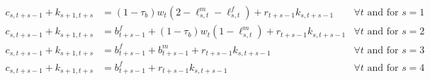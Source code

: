    \begin{subequations}
 \label{eq:BCs}
 	 \begin{align}
 	c_{s,t+s-1} + k_{s+1,t+s} &= (1-\tau_b)w_t (2-\ell_{s,t}^m - \ell_{s,t}^f) + r_{t+s-1}k_{s,t+s-1} & \forall t\text{ and for $s=1$} \\
 	c_{s,t+s-1} + k_{s+1,t+s} &= b_{t+s-1}^f+(1-\tau_b)w_t (1-\ell_{s,t}^m ) + r_{t+s-1}k_{s,t+s-1} & \forall t\text{ and for $s=2$} \\
 	c_{s,t+s-1} + k_{s+1,t+s} &= b_{t+s-1}^f+ b_{t+s-1}^m  + r_{t+s-1}k_{s,t+s-1} & \forall t\text{ and for $s=3$} \\
 	c_{s,t+s-1} + k_{s+1,t+s} &= b_{t+s-1}^f + r_{t+s-1}k_{s,t+s-1} & \forall t\text{ and for $s=4$} 
 \end{align}
 \end{subequations}

